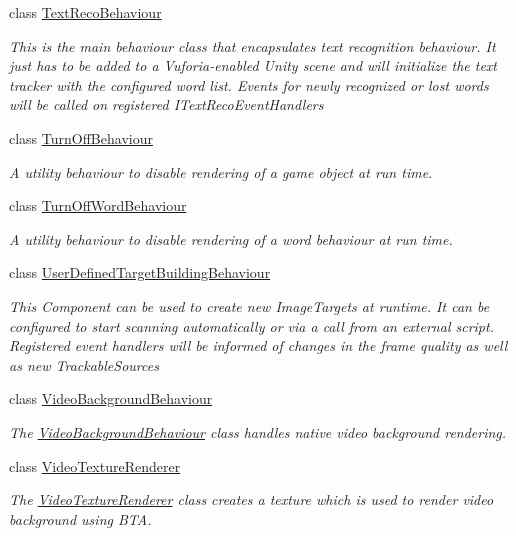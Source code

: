\begin{DoxyCompactItemize}
class \hyperlink{class_vuforia_1_1_text_reco_behaviour}{Text\+Reco\+Behaviour}
\begin{DoxyCompactList}\small\item\em This is the main behaviour class that encapsulates text recognition behaviour. It just has to be added to a Vuforia-\/enabled Unity scene and will initialize the text tracker with the configured word list. Events for newly recognized or lost words will be called on registered I\+Text\+Reco\+Event\+Handlers \end{DoxyCompactList}\item 
class \hyperlink{class_vuforia_1_1_turn_off_behaviour}{Turn\+Off\+Behaviour}
\begin{DoxyCompactList}\small\item\em A utility behaviour to disable rendering of a game object at run time. \end{DoxyCompactList}\item 
class \hyperlink{class_vuforia_1_1_turn_off_word_behaviour}{Turn\+Off\+Word\+Behaviour}
\begin{DoxyCompactList}\small\item\em A utility behaviour to disable rendering of a word behaviour at run time. \end{DoxyCompactList}\item 
class \hyperlink{class_vuforia_1_1_user_defined_target_building_behaviour}{User\+Defined\+Target\+Building\+Behaviour}
\begin{DoxyCompactList}\small\item\em This Component can be used to create new Image\+Targets at runtime. It can be configured to start scanning automatically or via a call from an external script. Registered event handlers will be informed of changes in the frame quality as well as new Trackable\+Sources \end{DoxyCompactList}\item 
class \hyperlink{class_vuforia_1_1_video_background_behaviour}{Video\+Background\+Behaviour}
\begin{DoxyCompactList}\small\item\em The \hyperlink{class_vuforia_1_1_video_background_behaviour}{Video\+Background\+Behaviour} class handles native video background rendering. \end{DoxyCompactList}\item 
class \hyperlink{class_vuforia_1_1_video_texture_renderer}{Video\+Texture\+Renderer}
\begin{DoxyCompactList}\small\item\em The \hyperlink{class_vuforia_1_1_video_texture_renderer}{Video\+Texture\+Renderer} class creates a texture which is used to render video background using B\+T\+A. \end{DoxyCompactList}\item 

\end{DoxyCompactItemize}
